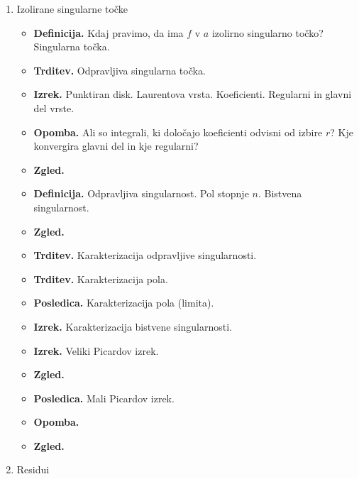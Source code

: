 \begin{enumerate}
    \item Izolirane singularne točke
    \begin{itemize}
        \item \textbf{Definicija.} Kdaj pravimo, da ima \(f\) v \(a\) izolirno singularno točko? Singularna točka.
        \item \textbf{Trditev.} Odpravljiva singularna točka.
        \item \textbf{Izrek.} Punktiran disk. Laurentova vrsta. Koeficienti. Regularni in glavni del vrste.
        \item \textbf{Opomba.} Ali so integrali, ki določajo koeficienti odvisni od izbire \(r\)? Kje konvergira glavni del in kje regularni?
        \item \textbf{Zgled.} 
        \item \textbf{Definicija.} Odpravljiva singularnost. Pol stopnje \(n\). Bistvena singularnost.
        \item \textbf{Zgled.} 
        \item \textbf{Trditev.} Karakterizacija odpravljive singularnosti.
        \item \textbf{Trditev.} Karakterizacija pola.
        \item \textbf{Posledica.} Karakterizacija pola (limita).
        \item \textbf{Izrek.} Karakterizacija bistvene singularnosti.
        \item \textbf{Izrek.} Veliki Picardov izrek.
        \item \textbf{Zgled.} \todo{}
        \item \textbf{Posledica.} Mali Picardov izrek.
        \item \textbf{Opomba.} 
        \item \textbf{Zgled.} \todo{} 
    \end{itemize}

    \item Residui

\end{enumerate}